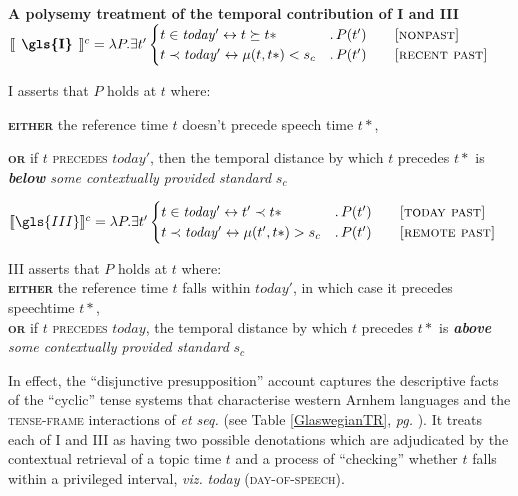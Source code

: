 \pex{}\textbf{A polysemy treatment of the temporal contribution of \gls{I} and \gls{III} }
\a$\llbracket\textbf{\phantom{I}\gls{I}\phantom{I}}\rrbracket^{c}=\lambda P.\exists t'\begin{cases}t\in \mathit{today'}\leftrightarrow t\succeq t*&.\,P(t')\qquad\textsc{[nonpast]}\\
	t\prec \mathit{today'} \leftrightarrow \mu(t,t*)<s_c&.\,P(t')\qquad\textsc{[recent past]}
\end{cases}$

\gls{I} asserts that $ P $ holds at $ t $ where:

\textbf{\textsc{either}} the reference time $ t$ doesn't precede speech time $ t*$,

\indent \textbf{\textsc{or}} if $ t $ \textsc{precedes}  $ \mathit{today'} $, then the temporal distance by which $ t $ precedes $ t* $ is \textit{\textbf{below} some contextually provided standard} $ s_c $

\a$\llbracket\gls{III}\rrbracket^{c}=\lambda P.\exists t'\begin{cases}t\in \mathit{today'}\leftrightarrow t'\prec t*&.\,P(t')\qquad\textsc{[today past]}\\
	t\prec \mathit{today'} \leftrightarrow\mu(t',t*)>s_c&.\,P(t')\qquad\textsc{[remote past]}
\end{cases}$

\gls{III} asserts that $ P $ holds at $ t $ where: \\
\textbf{\textsc{either}} the reference time $ t $ falls within $ \mathit{today'} $, in which case it precedes speechtime $ t* $,\\ \textbf{\textsc{or}} if $ t $ \textsc{precedes} $ today $, the temporal distance by which $ t $ precedes $ t* $ is \textit{\textbf{above} some contextually provided standard} $ s_c $
\xe

In effect, the ``disjunctive presupposition'' account captures the descriptive facts of the ``cyclic'' tense systems that characterise western Arnhem languages and the \textsc{tense-frame} interactions of \citealt{Glasgow1964} \textit{et seq.} (see Table \ref{GlaswegianTR}, \textit{pg.} \pageref{GlaswegianTR}). It treats each of \gls{I} and \gls{III} as having two possible denotations which are adjudicated by the contextual retrieval of a topic time $ t $ and a process of ``checking'' whether $ t $ falls within a privileged interval, \textit{viz.} \textit{today} \textsc{(day-of-speech)}.

